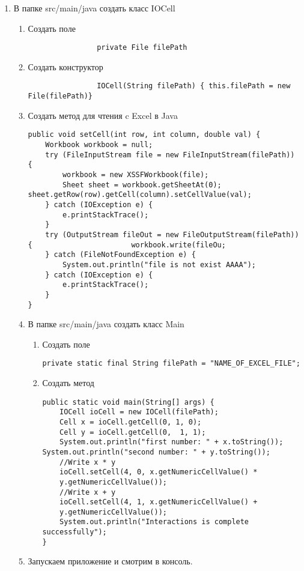 \begin{enumerate}
	\item В папке src/main/java создать класс IOCell
		\begin{enumerate}
			\item Создать поле 
			\begin{lstlisting}
				private File filePath
			\end{lstlisting}
			\item Создать конструктор 
			\begin{lstlisting}
				IOCell(String filePath) { this.filePath = new File(filePath)}
			\end{lstlisting}
			\item Создать метод для чтения c Excel в Java
			\begin{lstlisting}
public void setCell(int row, int column, double val) {
	Workbook workbook = null;
	try (FileInputStream file = new FileInputStream(filePath)) {
		workbook = new XSSFWorkbook(file);
		Sheet sheet = workbook.getSheetAt(0);						sheet.getRow(row).getCell(column).setCellValue(val);
	} catch (IOException e) {
		e.printStackTrace();
	}
	try (OutputStream fileOut = new FileOutputStream(filePath)) {						workbook.write(fileOu;
	} catch (FileNotFoundException e) {
		System.out.println("file is not exist AAAA");
	} catch (IOException e) {
		e.printStackTrace();
	}
}
			\end{lstlisting}
			\item В папке src/main/java создать класс Main
			\begin{enumerate}
				\item Создать поле
				\begin{lstlisting}
private static final String filePath = "NAME_OF_EXCEL_FILE";
				\end{lstlisting}
				\item Создать метод
\begin{lstlisting}
public static void main(String[] args) {
	IOCell ioCell = new IOCell(filePath);
	Cell x = ioCell.getCell(0, 1, 0);
	Cell y = ioCell.getCell(0,  1, 1);
	System.out.println("first number: " + x.toString());				System.out.println("second number: " + y.toString());
	//Write x * y
	ioCell.setCell(4, 0, x.getNumericCellValue() *
	y.getNumericCellValue());
	//Write x + y
	ioCell.setCell(4, 1, x.getNumericCellValue() +
	y.getNumericCellValue());
	System.out.println("Interactions is complete successfully");
}
\end{lstlisting}
			\end{enumerate}
			\item  Запускаем приложение и смотрим в консоль.
		\end{enumerate}
\end{enumerate}
